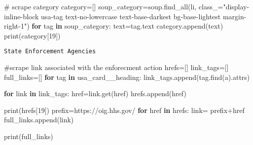 \documentclass[
  letterpaper,
  DIV=11,
  numbers=noendperiod]{scrartcl}
\newenvironment{Shaded}{\begin{snugshade}}{\end{snugshade}}
\newcommand{\BuiltInTok}[1]{\textcolor[rgb]{0.00,0.23,0.31}{#1}}
\newcommand{\CommentTok}[1]{\textcolor[rgb]{0.37,0.37,0.37}{#1}}
\newcommand{\ControlFlowTok}[1]{\textcolor[rgb]{0.00,0.23,0.31}{\textbf{#1}}}
\newcommand{\DecValTok}[1]{\textcolor[rgb]{0.68,0.00,0.00}{#1}}
\newcommand{\KeywordTok}[1]{\textcolor[rgb]{0.00,0.23,0.31}{\textbf{#1}}}
\newcommand{\NormalTok}[1]{\textcolor[rgb]{0.00,0.23,0.31}{#1}}
\newcommand{\OperatorTok}[1]{\textcolor[rgb]{0.37,0.37,0.37}{#1}}
\newcommand{\StringTok}[1]{\textcolor[rgb]{0.13,0.47,0.30}{#1}}
\begin{document}
\begin{Shaded}
\begin{Highlighting}[]
\CommentTok{\# scrape category}
\NormalTok{category}\OperatorTok{=}\NormalTok{[]}
\NormalTok{soup\_category}\OperatorTok{=}\NormalTok{soup.find\_all(}\StringTok{\textquotesingle{}li\textquotesingle{}}\NormalTok{, class\_}\OperatorTok{=}\StringTok{"display{-}inline{-}block usa{-}tag text{-}no{-}lowercase text{-}base{-}darkest bg{-}base{-}lightest margin{-}right{-}1"}\NormalTok{)}
\ControlFlowTok{for}\NormalTok{ tag }\KeywordTok{in}\NormalTok{ soup\_category:}
\NormalTok{  text}\OperatorTok{=}\NormalTok{tag.text}
\NormalTok{  category.append(text)}
\BuiltInTok{print}\NormalTok{(category[}\DecValTok{19}\NormalTok{])}
\end{Highlighting}
\end{Shaded}

\begin{verbatim}
State Enforcement Agencies
\end{verbatim}

\begin{Shaded}
\begin{Highlighting}[]
\CommentTok{\#scrape link associated with the enforecment action }
\NormalTok{hrefs}\OperatorTok{=}\NormalTok{[]}
\NormalTok{link\_tags}\OperatorTok{=}\NormalTok{[]}
\NormalTok{full\_links}\OperatorTok{=}\NormalTok{[]}
\ControlFlowTok{for}\NormalTok{ tag }\KeywordTok{in}\NormalTok{ usa\_card\_\_heading:}
\NormalTok{  link\_tags.append(tag.find(}\StringTok{\textquotesingle{}a\textquotesingle{}}\NormalTok{).attrs)}

\ControlFlowTok{for}\NormalTok{ link }\KeywordTok{in}\NormalTok{ link\_tags:}
\NormalTok{  href}\OperatorTok{=}\NormalTok{link.get(}\StringTok{\textquotesingle{}href\textquotesingle{}}\NormalTok{)}
\NormalTok{  hrefs.append(href)}

\BuiltInTok{print}\NormalTok{(hrefs[}\DecValTok{19}\NormalTok{])}
\NormalTok{prefix}\OperatorTok{=}\StringTok{\textquotesingle{}https://oig.hhs.gov/\textquotesingle{}}
\ControlFlowTok{for}\NormalTok{ href }\KeywordTok{in}\NormalTok{ hrefs:}
\NormalTok{  link}\OperatorTok{=}\NormalTok{ prefix}\OperatorTok{+}\NormalTok{href}
\NormalTok{  full\_links.append(link)}

\BuiltInTok{print}\NormalTok{(full\_links)}
\end{Highlighting}
\end{Shaded}
\end{document}
